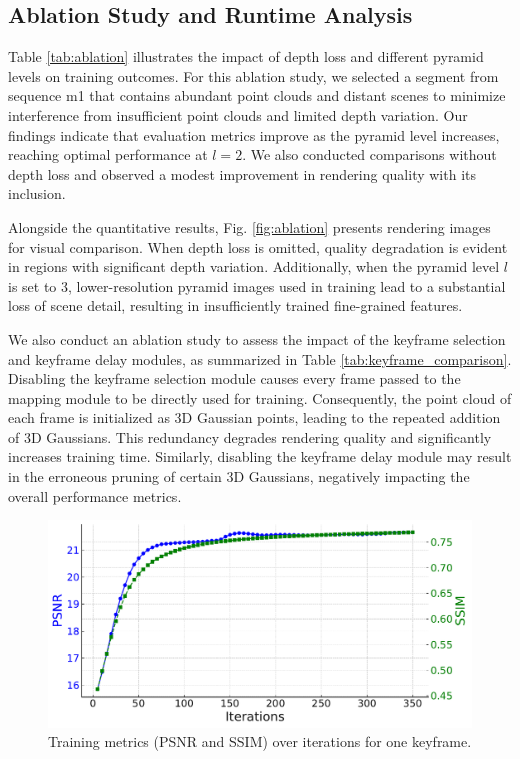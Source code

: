 \documentclass[lettersize,journal]{IEEEtran}
\begin{document}
\subsection{Ablation Study and Runtime Analysis}

Table \ref{tab:ablation} illustrates the impact of depth loss and different pyramid levels on training outcomes. For this ablation study, we selected a segment from sequence m1 that contains abundant point clouds and distant scenes to minimize interference from insufficient point clouds and limited depth variation. Our findings indicate that evaluation metrics improve as the pyramid level increases, reaching optimal performance at $l=2$. We also conducted comparisons without depth loss and observed a modest improvement in rendering quality with its inclusion.

Alongside the quantitative results, Fig. \ref{fig:ablation} presents rendering images for visual comparison. When depth loss is omitted, quality degradation is evident in regions with significant depth variation. Additionally, when the pyramid level $l$ is set to 3, lower-resolution pyramid images used in training lead to a substantial loss of scene detail, resulting in insufficiently trained fine-grained features.

We also conduct an ablation study to assess the impact of the keyframe selection and keyframe delay modules, as summarized in Table \ref{tab:keyframe_comparison}. Disabling the keyframe selection module causes every frame passed to the mapping module to be directly used for training. Consequently, the point cloud of each frame is initialized as 3D Gaussian points, leading to the repeated addition of 3D Gaussians. This redundancy degrades rendering quality and significantly increases training time. Similarly, disabling the keyframe delay module may result in the erroneous pruning of certain 3D Gaussians, negatively impacting the overall performance metrics.

\begin{figure}
    \centering
    \includegraphics[width=0.9\columnwidth]{image/runtime/runtimechart.pdf}
    \caption{Training metrics (PSNR and SSIM) over iterations for one keyframe.}
    \label{fig:psnrssim}
\end{figure}
\end{document}
